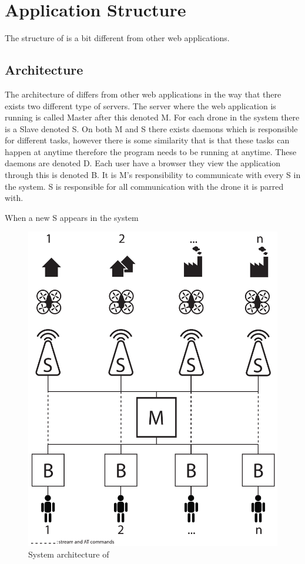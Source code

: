 \section{Application Structure}

The structure of \projectname{} is a bit different from other web applications.

\subsection{Architecture}

The architecture of \projectname{} differs from other web applications in the way that there exists two different type of servers. The server where the web application is running is called Master after this denoted M.
For each drone in the system there is a Slave denoted S. 
On both M and S there exists daemons which is responsible for different tasks, however there is some similarity that is that these tasks can happen at anytime therefore the program needs to be running at anytime. These daemons are denoted D.
Each user have a browser they view the application through this is denoted B.
It is M's responsibility to communicate with every S in the system.
S is responsible for all communication with the drone it is parred with.

When a new S appears in the system

\begin{figure}[htb]
    \centering 
    \includegraphics[width=\textwidth]{gfx/system_architecture.pdf}
    \caption{System architecture of \projectname{}}
    \label{fig:system_architecture}
\end{figure}


